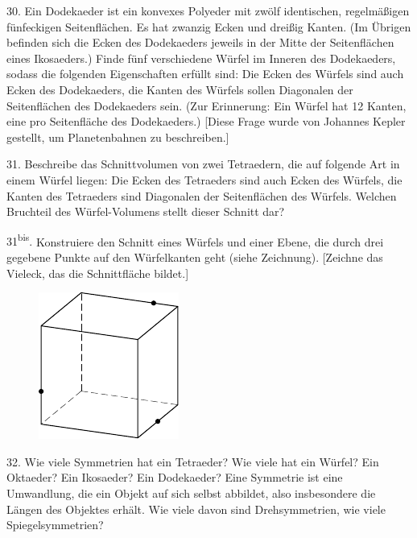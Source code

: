 \begin{problem}{30.}
	Ein Dodekaeder ist ein konvexes Polyeder mit zwölf identischen, regelmäßigen fünfeckigen Seitenflächen. Es hat zwanzig Ecken und dreißig Kanten. (Im Übrigen befinden sich die Ecken des Dodekaeders jeweils in der Mitte der Seitenflächen eines Ikosaeders.)
	Finde fünf verschiedene Würfel im Inneren des Dodekaeders, sodass die folgenden Eigenschaften erfüllt sind: Die Ecken des Würfels sind auch Ecken des Dodekaeders, die Kanten des Würfels sollen Diagonalen der Seitenflächen des Dodekaeders sein. (Zur Erinnerung: Ein Würfel hat 12 Kanten, eine pro Seitenfläche des Dodekaeders.) 
	[Diese Frage wurde von Johannes Kepler gestellt, um Planetenbahnen zu beschreiben.]
\end{problem}

\begin{problem}{31.}
	Beschreibe das Schnittvolumen von zwei Tetraedern, die auf folgende Art in einem Würfel liegen: Die Ecken des Tetraeders sind auch Ecken des Würfels, die Kanten des Tetraeders sind Diagonalen der Seitenflächen des Würfels.
	Welchen Bruchteil des Würfel-Volumens stellt dieser Schnitt dar?
\end{problem}

\begin{problem}{31\textsuperscript{bis}.} 
	Konstruiere den Schnitt eines Würfels und einer Ebene, die durch drei gegebene Punkte auf den Würfelkanten geht (siehe Zeichnung). [Zeichne das Vieleck, das die Schnittfläche bildet.]
	\begin{figure}
		\includegraphics{taskbook-15}
	\end{figure}
\end{problem}

\begin{problem}{32.}
	Wie viele Symmetrien hat ein Tetraeder? Wie viele hat ein Würfel? Ein Oktaeder? Ein Ikosaeder? Ein Dodekaeder? Eine Symmetrie ist eine Umwandlung, die ein Objekt auf sich selbst abbildet, also insbesondere die Längen des Objektes erhält. 
	Wie viele davon sind Drehsymmetrien, wie viele Spiegelsymmetrien?
\end{problem}

